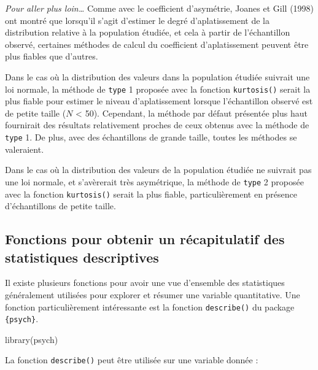 \documentclass[
  letterpaper,
]{book}
\newenvironment{Shaded}{\begin{snugshade}}{\end{snugshade}}
\newcommand{\AttributeTok}[1]{\textcolor[rgb]{0.40,0.45,0.13}{#1}}
\newcommand{\FloatTok}[1]{\textcolor[rgb]{0.68,0.00,0.00}{#1}}
\newcommand{\FunctionTok}[1]{\textcolor[rgb]{0.28,0.35,0.67}{#1}}
\newcommand{\NormalTok}[1]{\textcolor[rgb]{0.00,0.23,0.31}{#1}}
\newcommand{\SpecialCharTok}[1]{\textcolor[rgb]{0.37,0.37,0.37}{#1}}
\begin{document}
\emph{Pour aller plus loin\ldots{}} Comme avec le coefficient
d'asymétrie, Joanes et Gill (1998) ont montré que lorsqu'il s'agit
d'estimer le degré d'aplatissement de la distribution relative à la
population étudiée, et cela à partir de l'échantillon observé, certaines
méthodes de calcul du coefficient d'aplatissement peuvent être plus
fiables que d'autres.

Dans le cas où la distribution des valeurs dans la population étudiée
suivrait une loi normale, la méthode de \texttt{type} 1 proposée avec la
fonction \texttt{kurtosis()} serait la plus fiable pour estimer le
niveau d'aplatissement lorsque l'échantillon observé est de petite
taille (\(N\) \textless{} 50). Cependant, la méthode par défaut
présentée plus haut fournirait des résultats relativement proches de
ceux obtenus avec la méthode de \texttt{type} 1. De plus, avec des
échantillons de grande taille, toutes les méthodes se valeraient.

Dans le cas où la distribution des valeurs de la population étudiée ne
suivrait pas une loi normale, et s'avèrerait très asymétrique, la
méthode de \texttt{type} 2 proposée avec la fonction \texttt{kurtosis()}
serait la plus fiable, particulièrement en présence d'échantillons de
petite taille.

\subsection{Fonctions pour obtenir un récapitulatif des statistiques
descriptives}\label{fonctions-pour-obtenir-un-ruxe9capitulatif-des-statistiques-descriptives}

Il existe plusieurs fonctions pour avoir une vue d'ensemble des
statistiques généralement utilisées pour explorer et résumer une
variable quantitative. Une fonction particulièrement intéressante est la
fonction \texttt{describe()} du package \texttt{\{psych\}}.

\begin{Shaded}
\begin{Highlighting}[]
\FunctionTok{library}\NormalTok{(psych)}
\end{Highlighting}
\end{Shaded}

La fonction \texttt{describe()} peut être utilisée sur une variable
donnée :

\begin{Shaded}
\end{Shaded}
\end{document}
